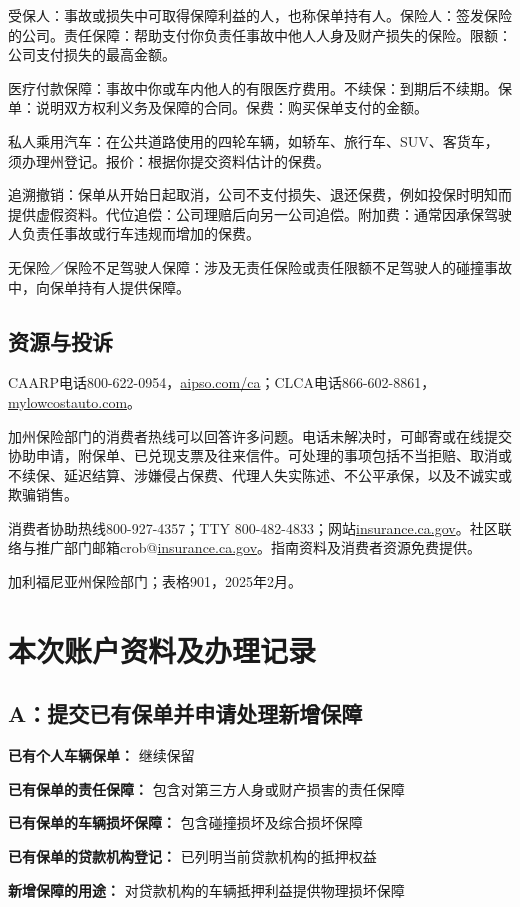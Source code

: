\documentclass[UTF8,fontset=none,11pt,a4paper]{ctexart}
\begin{document}
受保人：事故或损失中可取得保障利益的人，也称保单持有人。保险人：签发保险的公司。责任保障：帮助支付你负责任事故中他人人身及财产损失的保险。限额：公司支付损失的最高金额。


医疗付款保障：事故中你或车内他人的有限医疗费用。不续保：到期后不续期。保单：说明双方权利义务及保障的合同。保费：购买保单支付的金额。


私人乘用汽车：在公共道路使用的四轮车辆，如轿车、旅行车、SUV、客货车，须办理州登记。报价：根据你提交资料估计的保费。


追溯撤销：保单从开始日起取消，公司不支付损失、退还保费，例如投保时明知而提供虚假资料。代位追偿：公司理赔后向另一公司追偿。附加费：通常因承保驾驶人负责任事故或行车违规而增加的保费。


无保险／保险不足驾驶人保障：涉及无责任保险或责任限额不足驾驶人的碰撞事故中，向保单持有人提供保障。


\subsection*{资源与投诉}
CAARP电话800-622-0954，\url{aipso.com/ca}；CLCA电话866-602-8861，\url{mylowcostauto.com}。


加州保险部门的消费者热线可以回答许多问题。电话未解决时，可邮寄或在线提交协助申请，附保单、已兑现支票及往来信件。可处理的事项包括不当拒赔、取消或不续保、延迟结算、涉嫌侵占保费、代理人失实陈述、不公平承保，以及不诚实或欺骗销售。


消费者协助热线800-927-4357；TTY 800-482-4833；网站\url{insurance.ca.gov}。社区联络与推广部门邮箱crob@\url{insurance.ca.gov}。指南资料及消费者资源免费提供。


加利福尼亚州保险部门；表格901，2025年2月。


\section*{本次账户资料及办理记录}
\subsection*{A：提交已有保单并申请处理新增保障}
\textbf{已有个人车辆保单：} 继续保留


\textbf{已有保单的责任保障：} 包含对第三方人身或财产损害的责任保障


\textbf{已有保单的车辆损坏保障：} 包含碰撞损坏及综合损坏保障


\textbf{已有保单的贷款机构登记：} 已列明当前贷款机构的抵押权益


\textbf{新增保障的用途：} 对贷款机构的车辆抵押利益提供物理损坏保障
\end{document}
